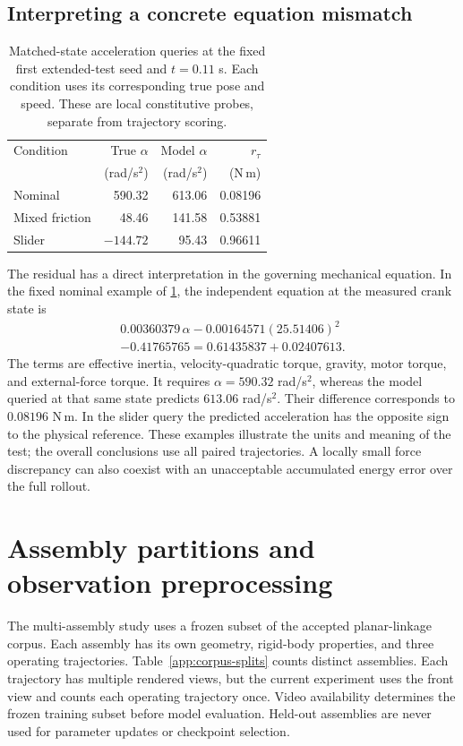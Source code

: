 \documentclass[10pt,twocolumn,letterpaper]{article}
\begin{document}
\subsection{Interpreting a concrete equation mismatch}
\begin{table}[t]
\caption{Matched-state acceleration queries at the fixed first extended-test seed and $t=0.11$ s. Each condition uses its corresponding true pose and speed. These are local constitutive probes, separate from trajectory scoring.}
\label{tab:local}
\centering
\small
\begin{tabular}{lrrr}
\toprule
Condition & True $\alpha$ & Model $\alpha$ & $r_\tau$\\
& (rad/s$^2$) & (rad/s$^2$) & (N\,m)\\
\midrule
Nominal & 590.32 & 613.06 & 0.08196\\
Mixed friction & 48.46 & 141.58 & 0.53881\\
Slider & $-144.72$ & 95.43 & 0.96611\\
\bottomrule
\end{tabular}
\end{table}
The residual has a direct interpretation in the governing mechanical equation. In the fixed nominal example of \cref{tab:local}, the independent equation at the measured crank state is
\begin{equation}
\begin{split}
0.00360379\,\alpha
-0.00164571(25.51406)^2\\
-0.41765765=0.61435837+0.02407613.
\end{split}
\label{eq:worked}
\end{equation}
The terms are effective inertia, velocity-quadratic torque, gravity, motor torque, and external-force torque. It requires $\alpha=590.32$ rad/s$^2$, whereas the model queried at that same state predicts $613.06$ rad/s$^2$. Their difference corresponds to $0.08196$ N\,m. In the slider query the predicted acceleration has the opposite sign to the physical reference. These examples illustrate the units and meaning of the test; the overall conclusions use all paired trajectories. A locally small force discrepancy can also coexist with an unacceptable accumulated energy error over the full rollout.



\section{Assembly partitions and observation preprocessing}
\label{app:corpus-data}
The multi-assembly study uses a frozen subset of the accepted planar-linkage corpus. Each assembly has its own geometry, rigid-body properties, and three operating trajectories. Table~\ref{app:corpus-splits} counts distinct assemblies. Each trajectory has multiple rendered views, but the current experiment uses the front view and counts each operating trajectory once. Video availability determines the frozen training subset before model evaluation. Held-out assemblies are never used for parameter updates or checkpoint selection.
\end{document}
